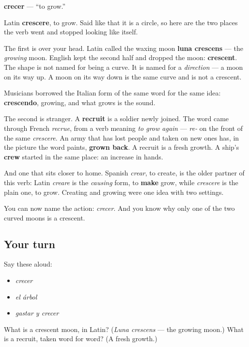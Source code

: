 \begin{cousinweb}
\textbf{crecer} — \textquotedblleft{}to grow.\textquotedblright{}

Latin \textbf{crescere}, to grow. Said like that it is a circle, so here are the two places the verb went and stopped looking like itself.

The first is over your head. Latin called the waxing moon \textbf{luna crescens} — the \emph{growing} moon. English kept the second half and dropped the moon: \textbf{crescent}. The shape is not named for being a curve. It is named for a \emph{direction} — a moon on its way up. A moon on its way down is the same curve and is not a crescent.

Musicians borrowed the Italian form of the same word for the same idea: \textbf{crescendo}, growing, and what grows is the sound.

The second is stranger. A \textbf{recruit} is a soldier newly joined. The word came through French \emph{recrue}, from a verb meaning \emph{to grow again} — \emph{re-} on the front of the same \emph{crescere}. An army that has lost people and taken on new ones has, in the picture the word paints, \textbf{grown back}. A recruit is a fresh growth. A ship's \textbf{crew} started in the same place: an increase in hands.

And one that sits closer to home. Spanish \emph{crear}, to create, is the older partner of this verb: Latin \emph{creare} is the \emph{causing} form, to \textbf{make} grow, while \emph{crescere} is the plain one, to grow. Creating and growing were one idea with two settings.
\end{cousinweb}

\begin{grammarlens}[title={What you've built}]
You can now name the action: \emph{crecer}. And you know why only one of the two curved moons is a crescent.
\end{grammarlens}

\subsection*{Your turn}
Say these aloud:

\begin{itemize}
\raggedright
  \item \emph{crecer}
  \item \emph{el árbol}
  \item \emph{gastar y crecer}
\end{itemize}

\begin{tcolorbox}[breakable,colback=teal!4,colframe=teal!35!black,title={Before you move on}]
What is a crescent moon, in Latin? (\emph{Luna crescens} — the growing moon.) What is a recruit, taken word for word? (A fresh growth.)
\end{tcolorbox}
